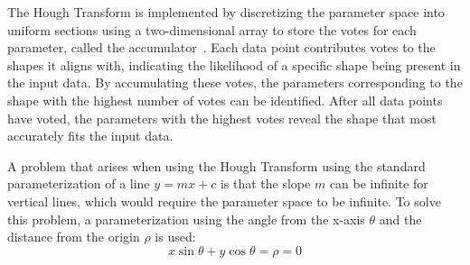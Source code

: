 The Hough Transform is implemented by discretizing the parameter space into uniform sections
using a two-dimensional array to store the votes for each parameter, called the accumulator~\parencite{duda_use_1972}.
Each data point contributes votes to the shapes it aligns with, indicating the likelihood of a specific shape being present in the input data.
By accumulating these votes, the parameters corresponding to the shape with the highest number of votes can be identified.
After all data points have voted, the parameters with the highest votes reveal the shape that most accurately fits the input data.

A problem that arises when using the Hough Transform using the standard parameterization of a line $y = mx + c$
is that the slope $m$ can be infinite for vertical lines, which would require the parameter space to be infinite.
To solve this problem, a parameterization using the angle from the x-axis $\theta$ and the distance from the origin $\rho$ is used:
\begin{equation}
    x \sin \theta + y \cos \theta = \rho = 0
\end{equation}
